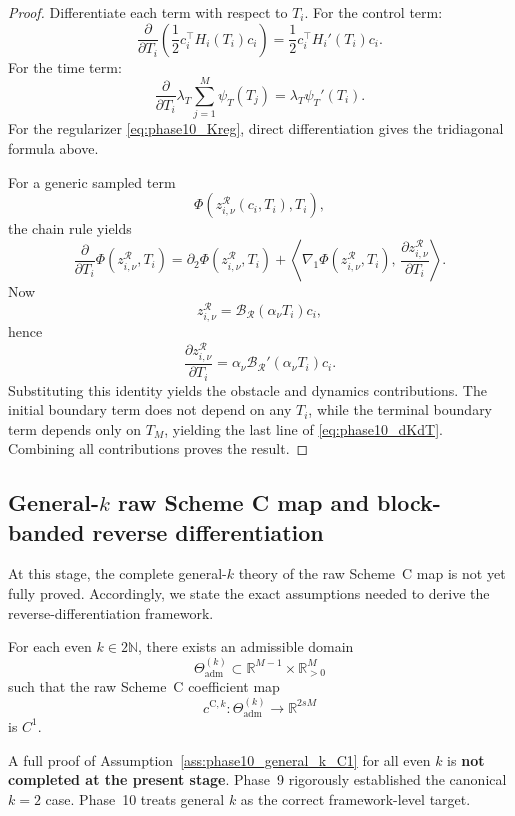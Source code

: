 \begin{proof}
Differentiate each term with respect to \(T_i\).
For the control term:
\[
\frac{\partial}{\partial T_i}
\left(\frac12 c_i^\top H_i(T_i)c_i\right)
=
\frac12 c_i^\top H_i'(T_i)c_i.
\]
For the time term:
\[
\frac{\partial}{\partial T_i}\lambda_T\sum_{j=1}^{M}\psi_T(T_j)
=
\lambda_T\psi_T'(T_i).
\]
For the regularizer \eqref{eq:phase10_Kreg}, direct differentiation gives the tridiagonal formula above.

For a generic sampled term
\[
\Phi(z_{i,\nu}^{\mathcal R}(c_i,T_i),T_i),
\]
the chain rule yields
\[
\frac{\partial}{\partial T_i}\Phi(z_{i,\nu}^{\mathcal R},T_i)
=
\partial_2 \Phi(z_{i,\nu}^{\mathcal R},T_i)
+
\left\langle
\nabla_1 \Phi(z_{i,\nu}^{\mathcal R},T_i),
\,
\frac{\partial z_{i,\nu}^{\mathcal R}}{\partial T_i}
\right\rangle.
\]
Now
\[
z_{i,\nu}^{\mathcal R}
=
\mathcal B_{\mathcal R}(\alpha_\nu T_i)c_i,
\]
hence
\[
\frac{\partial z_{i,\nu}^{\mathcal R}}{\partial T_i}
=
\alpha_\nu \mathcal B_{\mathcal R}'(\alpha_\nu T_i)c_i.
\]
Substituting this identity yields the obstacle and dynamics contributions.
The initial boundary term does not depend on any \(T_i\), while the terminal boundary term depends only on \(T_M\), yielding the last line of \eqref{eq:phase10_dKdT}.
Combining all contributions proves the result.
\end{proof}

\subsection{General-\texorpdfstring{$k$}{k} raw Scheme C map and block-banded reverse differentiation}
\label{subsec:phase10_general_k_backward}

At this stage, the complete general-\(k\) theory of the raw Scheme~C map is not yet fully proved.
Accordingly, we state the exact assumptions needed to derive the reverse-differentiation framework.

\begin{assumption}
\label{ass:phase10_general_k_C1}
For each even \(k\in 2\mathbb N\), there exists an admissible domain
\[
\Theta_{\mathrm{adm}}^{(k)}\subset \mathbb R^{M-1}\times\mathbb R_{>0}^{M}
\]
such that the raw Scheme~C coefficient map
\[
c^{\mathrm{C},k}:\Theta_{\mathrm{adm}}^{(k)}\to \mathbb R^{2sM}
\]
is \(C^1\).
\end{assumption}

\begin{remark}
\label{rem:phase10_general_k_C1_status}
A full proof of Assumption~\ref{ass:phase10_general_k_C1} for all even \(k\) is \textbf{not completed at the present stage}.
Phase~9 rigorously established the canonical \(k=2\) case.
Phase~10 treats general \(k\) as the correct framework-level target.
\end{remark}

